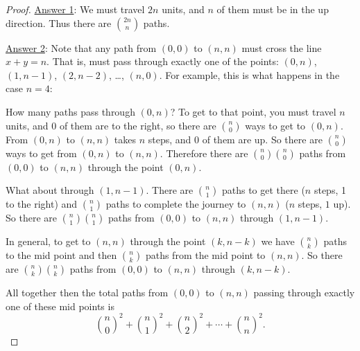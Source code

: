\documentclass[12pt]{article}
\begin{document}
\begin{example}
\begin{solution}
\begin{proof}
      \underline{Answer 1}: We must travel $2n$ units, and $n$ of them must be in the up direction.  Thus there are ${2n \choose n}$ paths.
      
      \underline{Answer 2}: Note that any path from $(0,0)$ to $(n,n)$ must cross the line $x + y = n$.  That is, must pass through exactly one of the points: $(0,n)$, $(1,n-1)$, $(2,n-2)$, \ldots, $(n, 0)$.  For example, this is what happens in the case $n = 4$:
        
    \begin{center}
   \end{center}
     
     How many paths pass through $(0,n)$?  To get to that point, you must travel $n$ units, and $0$ of them are to the right, so there are ${n \choose 0}$ ways to get to $(0,n)$.  From $(0,n)$ to $(n,n)$ takes $n$ steps, and $0$ of them are up.  So there are ${n \choose 0}$ ways to get from $(0,n)$ to $(n,n)$.  Therefore there are ${n \choose 0}{n \choose 0}$ paths from $(0,0)$ to $(n,n)$ through the point $(0,n)$.  
     
     What about through $(1,n-1)$.  There are ${n \choose 1}$ paths to get there ($n$ steps, 1 to the right) and ${n \choose 1}$ paths to complete the journey to $(n,n)$ ($n$ steps, $1$ up).  So there are ${n \choose 1}{n \choose 1}$ paths from $(0,0)$ to $(n,n)$ through $(1,n-1)$.
     
     In general, to get to $(n,n)$ through the point $(k,n-k)$ we have ${n \choose k}$ paths to the mid point and then ${n \choose k}$ paths from the mid point to $(n,n)$.  So there are ${n \choose k}{n \choose k}$ paths from $(0,0)$ to $(n,n)$ through $(k, n-k)$.
     
     All together then the total paths from $(0,0)$ to $(n,n)$ passing through exactly one of these mid points is
     \[{n \choose 0}^2 + {n \choose 1}^2 + {n \choose 2}^2 + \cdots + {n \choose n}^2.\]      
   \end{proof}
  \end{solution}
\end{example}
\end{document}
